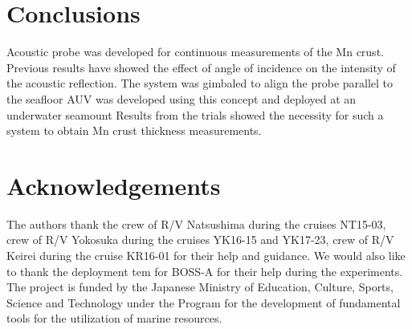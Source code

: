 \section{Conclusions}

Acoustic probe was developed for continuous measurements of the Mn crust.
Previous results have showed the effect of angle of incidence on the intensity of the acoustic reflection. 
The system was gimbaled to align the probe parallel to the seafloor
AUV was developed using this concept and deployed at an underwater seamount
Results from the trials showed the necessity for such a system to obtain Mn crust thickness measurements.


\section*{Acknowledgements}

The authors thank the crew of R/V Natsushima during the cruises NT15-03, crew of R/V Yokosuka during the cruises YK16-15 and YK17-23, crew of R/V Keirei during the cruise KR16-01 for their help and guidance. We would also like to thank the deployment tem for BOSS-A for their help during the experiments. The project is funded by the Japanese Ministry of Education, Culture, Sports, Science and Technology under the Program for the development of fundamental tools for the utilization of marine resources.